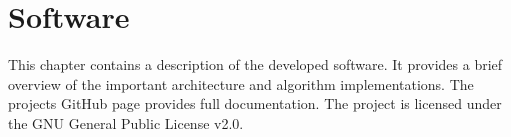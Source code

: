 \chapter[sw]{Software}

This chapter contains a description of the developed software. It provides a brief overview of the important architecture and algorithm implementations. The projects GitHub page provides full documentation. The project is licensed under the GNU General Public License v2.0. 

